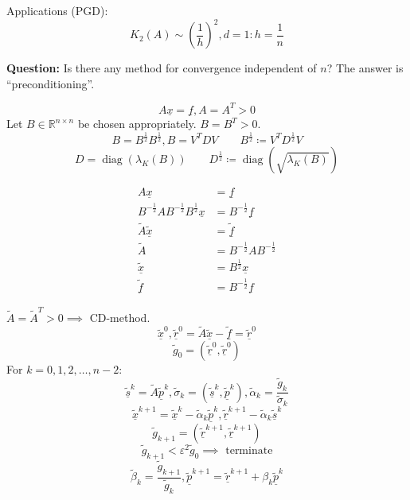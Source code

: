 \documentclass{article}
\begin{document}
Applications (PGD):
\[ K_2(A) \sim \left(\frac1h\right)^2, d = 1: h = \frac1n \]

\textbf{Question:} Is there any method for convergence independent of $n$? The answer is \enquote{preconditioning}.

\[ A \underline x = \underline f, A = A^T > 0 \]
Let $B \in \mathbb R^{n\times n}$ be chosen appropriately. $B = B^T > 0$.
\[ B = B^{\frac12} B^{\frac12}, B = V^T D V \qquad B^{\frac12} \coloneqq V^T D^{\frac12} V \]
\[ D = \operatorname{diag}(\lambda_K(B)) \qquad D^{\frac12} \coloneqq \operatorname{diag}(\sqrt{\lambda_K(B)}) \]

\begin{align*}
  A \underline x &= \underline f \\
  B^{-\frac12} A B^{-\frac12} B^{\frac12} \underline x &= B^{-\frac12} \underline f \\
  \tilde A \underline{\tilde x} &= \underline{\tilde f} \\
  \tilde A &= B^{-\frac12} A B^{-\frac12} \\
  \underline{\tilde x} &= B^{\frac12} \underline x \\
  \underline{\tilde f} &= B^{-\frac12} \underline f
\end{align*}

$\tilde A = \tilde A^T > 0 \implies$ CD-method.
\[ \underline{\tilde x}^0, \underline{\tilde r}^0 = \tilde A \underline{\tilde x} - \underline{\tilde f} = \underline{\tilde r}^0 \]
\[ \tilde g_0 = (\underline{\tilde r}^0, \underline{\tilde r}^0) \]
For $k=0,1,2,\ldots,n-2$:
\[ \underline{\tilde s}^k = \tilde A \underline{\tilde p}^k, \tilde \sigma_k = (\underline{\tilde s}^k, \underline{\tilde p}^k), \tilde \alpha_k = \frac{\tilde g_k}{\tilde \sigma_k} \]
\[ \underline{\tilde x}^{k+1} = \underline{\tilde x}^k - \tilde\alpha_k \underline{\tilde p}^k, \underline{\tilde r}^{k+1} - \tilde\alpha_k \underline{\tilde s}^k \]
\[ \tilde g_{k+1} = (\underline{\tilde r}^{k+1}, \underline{\tilde r}^{k+1}) \]
\[ \tilde g_{k+1} < \varepsilon^2 \tilde g_0 \implies \text{ terminate} \]
\[ \tilde \beta_k = \frac{\tilde g_{k+1}}{\tilde g_k}, \underline{\tilde p}^{k+1} = \underline{\tilde r}^{k+1} + \beta_k \underline{\tilde p}^k \]
\end{document}
